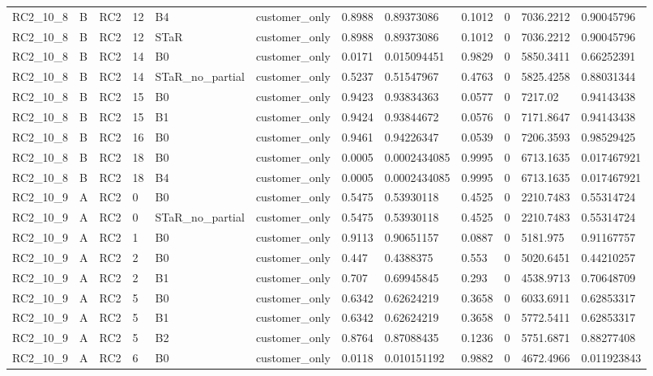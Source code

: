 \begin{longtable}{llllllllllll}
RC2\_10\_8 & B & RC2 & 12 & B4 & customer\_only & 0.8988 & 0.89373086 & 0.1012 & 0 & 7036.2212 & 0.90045796 \\
RC2\_10\_8 & B & RC2 & 12 & STaR & customer\_only & 0.8988 & 0.89373086 & 0.1012 & 0 & 7036.2212 & 0.90045796 \\
RC2\_10\_8 & B & RC2 & 14 & B0 & customer\_only & 0.0171 & 0.015094451 & 0.9829 & 0 & 5850.3411 & 0.66252391 \\
RC2\_10\_8 & B & RC2 & 14 & STaR\_no\_partial & customer\_only & 0.5237 & 0.51547967 & 0.4763 & 0 & 5825.4258 & 0.88031344 \\
RC2\_10\_8 & B & RC2 & 15 & B0 & customer\_only & 0.9423 & 0.93834363 & 0.0577 & 0 & 7217.02 & 0.94143438 \\
RC2\_10\_8 & B & RC2 & 15 & B1 & customer\_only & 0.9424 & 0.93844672 & 0.0576 & 0 & 7171.8647 & 0.94143438 \\
RC2\_10\_8 & B & RC2 & 16 & B0 & customer\_only & 0.9461 & 0.94226347 & 0.0539 & 0 & 7206.3593 & 0.98529425 \\
RC2\_10\_8 & B & RC2 & 18 & B0 & customer\_only & 0.0005 & 0.0002434085 & 0.9995 & 0 & 6713.1635 & 0.017467921 \\
RC2\_10\_8 & B & RC2 & 18 & B4 & customer\_only & 0.0005 & 0.0002434085 & 0.9995 & 0 & 6713.1635 & 0.017467921 \\
RC2\_10\_9 & A & RC2 & 0 & B0 & customer\_only & 0.5475 & 0.53930118 & 0.4525 & 0 & 2210.7483 & 0.55314724 \\
RC2\_10\_9 & A & RC2 & 0 & STaR\_no\_partial & customer\_only & 0.5475 & 0.53930118 & 0.4525 & 0 & 2210.7483 & 0.55314724 \\
RC2\_10\_9 & A & RC2 & 1 & B0 & customer\_only & 0.9113 & 0.90651157 & 0.0887 & 0 & 5181.975 & 0.91167757 \\
RC2\_10\_9 & A & RC2 & 2 & B0 & customer\_only & 0.447 & 0.4388375 & 0.553 & 0 & 5020.6451 & 0.44210257 \\
RC2\_10\_9 & A & RC2 & 2 & B1 & customer\_only & 0.707 & 0.69945845 & 0.293 & 0 & 4538.9713 & 0.70648709 \\
RC2\_10\_9 & A & RC2 & 5 & B0 & customer\_only & 0.6342 & 0.62624219 & 0.3658 & 0 & 6033.6911 & 0.62853317 \\
RC2\_10\_9 & A & RC2 & 5 & B1 & customer\_only & 0.6342 & 0.62624219 & 0.3658 & 0 & 5772.5411 & 0.62853317 \\
RC2\_10\_9 & A & RC2 & 5 & B2 & customer\_only & 0.8764 & 0.87088435 & 0.1236 & 0 & 5751.6871 & 0.88277408 \\
RC2\_10\_9 & A & RC2 & 6 & B0 & customer\_only & 0.0118 & 0.010151192 & 0.9882 & 0 & 4672.4966 & 0.011923843 \\

\end{longtable}
